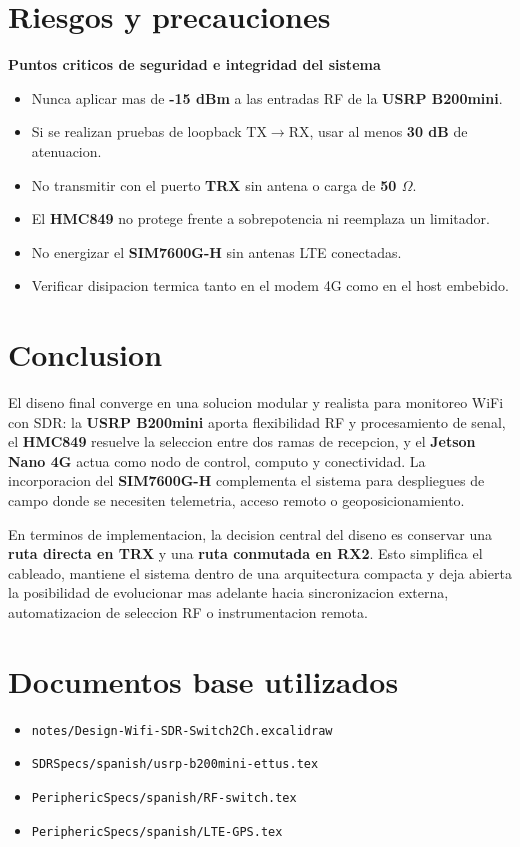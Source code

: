 \documentclass[11pt]{article}
\begin{document}
\section{Riesgos y precauciones}

\begin{advertencia}
\textbf{Puntos criticos de seguridad e integridad del sistema}
\end{advertencia}

\begin{itemize}[leftmargin=*]
    \item Nunca aplicar mas de \textbf{-15 dBm} a las entradas RF de la \textbf{USRP B200mini}.
    \item Si se realizan pruebas de loopback TX$\to$RX, usar al menos \textbf{30 dB} de atenuacion.
    \item No transmitir con el puerto \textbf{TRX} sin antena o carga de \textbf{50 $\Omega$}.
    \item El \textbf{HMC849} no protege frente a sobrepotencia ni reemplaza un limitador.
    \item No energizar el \textbf{SIM7600G-H} sin antenas LTE conectadas.
    \item Verificar disipacion termica tanto en el modem 4G como en el host embebido.
\end{itemize}

\section{Conclusion}

El diseno final converge en una solucion modular y realista para monitoreo WiFi con SDR: la \textbf{USRP B200mini} aporta flexibilidad RF y procesamiento de senal, el \textbf{HMC849} resuelve la seleccion entre dos ramas de recepcion, y el \textbf{Jetson Nano 4G} actua como nodo de control, computo y conectividad. La incorporacion del \textbf{SIM7600G-H} complementa el sistema para despliegues de campo donde se necesiten telemetria, acceso remoto o geoposicionamiento.

En terminos de implementacion, la decision central del diseno es conservar una \textbf{ruta directa en TRX} y una \textbf{ruta conmutada en RX2}. Esto simplifica el cableado, mantiene el sistema dentro de una arquitectura compacta y deja abierta la posibilidad de evolucionar mas adelante hacia sincronizacion externa, automatizacion de seleccion RF o instrumentacion remota.

\section{Documentos base utilizados}

\begin{itemize}[leftmargin=*]
    \item \texttt{notes/Design-Wifi-SDR-Switch2Ch.excalidraw}
    \item \texttt{SDRSpecs/spanish/usrp-b200mini-ettus.tex}
    \item \texttt{PeriphericSpecs/spanish/RF-switch.tex}
    \item \texttt{PeriphericSpecs/spanish/LTE-GPS.tex}
\end{itemize}
\end{document}
